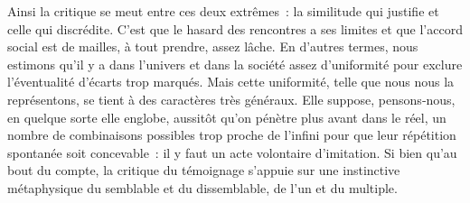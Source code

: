 \documentclass[french,twoside]{book} %
\newcommand{\astermono}{\medskip\centerline{\color{rubric}\large\selectfont{\syms ✻}}\medskip\par}%
\begin{document}
Ainsi la critique se meut entre ces deux extrêmes : la similitude qui justifie et celle qui discrédite. C’est que le hasard des rencontres a ses limites et que l’accord social est de mailles, à tout prendre, assez lâche. En d’autres termes, nous estimons qu’il y a dans l’univers et dans la société assez d’uniformité pour exclure l’éventualité d’écarts trop marqués. Mais cette uniformité, telle que nous nous la représentons, se tient à des caractères très généraux. Elle suppose, pensons‑nous, en quelque sorte elle englobe, aussitôt qu’on pénètre plus avant dans le réel, un nombre de combinaisons possibles trop proche de l’infini pour que leur répétition spontanée soit concevable : il y faut un acte volontaire d’imitation. Si bien qu’au bout du compte, la critique du témoignage s’appuie sur une instinctive métaphysique du semblable et du dissemblable, de l’un et du multiple.\par

\astermono
\end{document}

